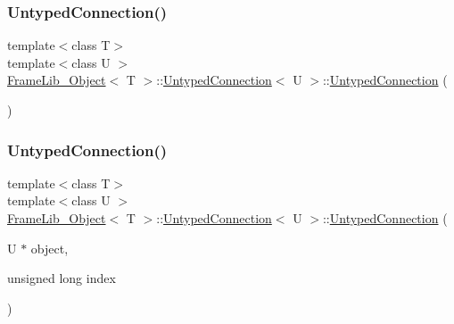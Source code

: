 \subsubsection{\texorpdfstring{Untyped\+Connection()}{UntypedConnection()}\hspace{0.1cm}{\footnotesize\ttfamily [1/2]}}
{\footnotesize\ttfamily template$<$class T$>$ \\
template$<$class U $>$ \\
\hyperlink{class_frame_lib___object}{Frame\+Lib\+\_\+\+Object}$<$ T $>$\+::\hyperlink{struct_frame_lib___object_1_1_untyped_connection}{Untyped\+Connection}$<$ U $>$\+::\hyperlink{struct_frame_lib___object_1_1_untyped_connection}{Untyped\+Connection} (\begin{DoxyParamCaption}{ }\end{DoxyParamCaption})\hspace{0.3cm}{\ttfamily [inline]}}

\mbox{\label{struct_frame_lib___object_1_1_untyped_connection_a3285c1e1381b29dd07d4213611a857f5}} 
\subsubsection{\texorpdfstring{Untyped\+Connection()}{UntypedConnection()}\hspace{0.1cm}{\footnotesize\ttfamily [2/2]}}
{\footnotesize\ttfamily template$<$class T$>$ \\
template$<$class U $>$ \\
\hyperlink{class_frame_lib___object}{Frame\+Lib\+\_\+\+Object}$<$ T $>$\+::\hyperlink{struct_frame_lib___object_1_1_untyped_connection}{Untyped\+Connection}$<$ U $>$\+::\hyperlink{struct_frame_lib___object_1_1_untyped_connection}{Untyped\+Connection} (\begin{DoxyParamCaption}\item[{U $\ast$}]{object,  }\item[{unsigned long}]{index }\end{DoxyParamCaption})\hspace{0.3cm}{\ttfamily [inline]}}



